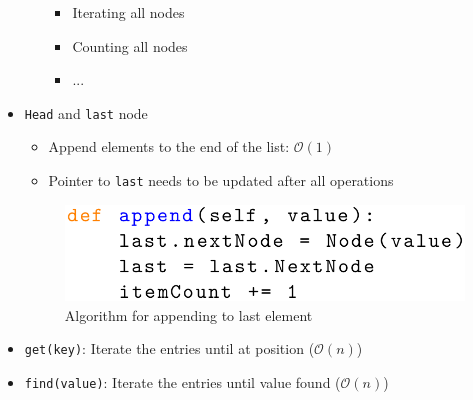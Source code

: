 \documentclass[12pt, a4paper]{scrartcl}
\newcommand{\bigO}{\mathcal{O}}
\begin{document}
\begin{itemize}
\begin{itemize}
\begin{itemize}
    \item Iterating all nodes
    \item Counting all nodes
    \item ...
    \end{itemize}
  \end{itemize}
\item \texttt{Head} and \texttt{last} node
  \begin{itemize}
  \item Append elements to the end of the list: $\bigO(1)$
  \item Pointer to \texttt{last} needs to be updated after all operations
  \end{itemize}
  \begin{figure}[htbp]
    \centering
    \includegraphics[width=.5\textwidth]{append_linked_algorithm}
    \caption{Algorithm for appending to last element}
  \label{fig:append_algorithm}
\end{figure}
\item \texttt{get(key)}: Iterate the entries until at position ($\bigO(n)$)
\item \texttt{find(value)}: Iterate the entries until value found ($\bigO(n)$)
\end{itemize}
\end{document}

